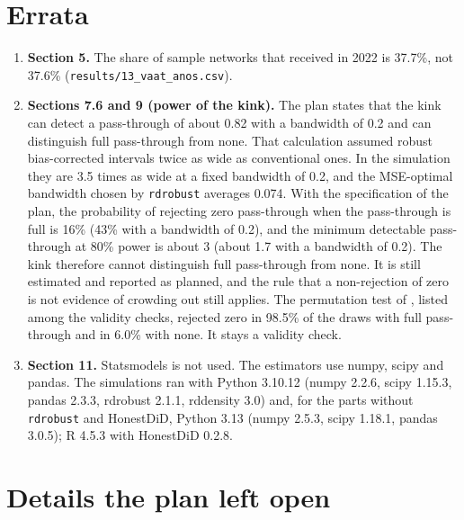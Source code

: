 \documentclass[11pt]{article}
\begin{document}
\section{Errata}

\begin{enumerate}[label=\arabic*.]
\item \textbf{Section 5.} The share of sample networks that received in 2022 is 37.7\%, not 37.6\% (\texttt{results/13\_vaat\_anos.csv}).

\item \textbf{Sections 7.6 and 9 (power of the kink).} The plan states that the kink can detect a pass-through of about 0.82 with a bandwidth of 0.2 and can distinguish full pass-through from none. That calculation assumed robust bias-corrected intervals twice as wide as conventional ones. In the simulation they are 3.5 times as wide at a fixed bandwidth of 0.2, and the MSE-optimal bandwidth chosen by \texttt{rdrobust} averages 0.074. With the specification of the plan, the probability of rejecting zero pass-through when the pass-through is full is 16\% (43\% with a bandwidth of 0.2), and the minimum detectable pass-through at 80\% power is about 3 (about 1.7 with a bandwidth of 0.2). The kink therefore cannot distinguish full pass-through from none. It is still estimated and reported as planned, and the rule that a non-rejection of zero is not evidence of crowding out still applies. The permutation test of \citet{ganong2018}, listed among the validity checks, rejected zero in 98.5\% of the draws with full pass-through and in 6.0\% with none. It stays a validity check.

\item \textbf{Section 11.} Statsmodels is not used. The estimators use numpy, scipy and pandas. The simulations ran with Python 3.10.12 (numpy 2.2.6, scipy 1.15.3, pandas 2.3.3, rdrobust 2.1.1, rddensity 3.0) and, for the parts without \texttt{rdrobust} and HonestDiD, Python 3.13 (numpy 2.5.3, scipy 1.18.1, pandas 3.0.5); R 4.5.3 with HonestDiD 0.2.8.
\end{enumerate}

\section{Details the plan left open}
\end{document}
